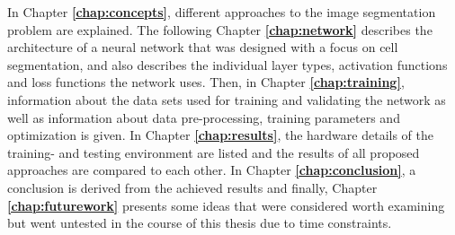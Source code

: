 \noindent In Chapter \textbf{\ref{chap:concepts}}, different approaches to the image segmentation problem are explained. The following Chapter \textbf{\ref{chap:network}} describes the architecture of a neural network that was designed with a focus on cell segmentation, and also describes the individual layer types, activation functions and loss functions the network uses. Then, in Chapter \textbf{\ref{chap:training}}, information about the data sets used for training and validating the network as well as information about data pre-processing, training parameters and optimization is given. In Chapter \textbf{\ref{chap:results}}, the hardware details of the training- and testing environment are listed and the results of all proposed approaches are compared to each other. In Chapter \textbf{\ref{chap:conclusion}}, a conclusion is derived from the achieved results and finally, Chapter \textbf{\ref{chap:futurework}} presents some ideas that were considered worth examining but went untested in the course of this thesis due to time constraints. 